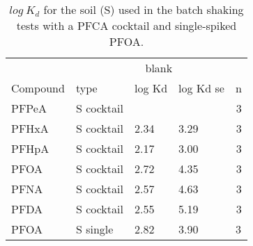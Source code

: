 \begin{table}[ht]
\caption{$log~K_d$ for the soil (S) used in the batch shaking tests with a PFCA cocktail and single-spiked PFOA.}
\centering
\label{apptab:soil_Kd}
\begin{tabular}{llllr} \toprule
         & \multicolumn{4}{c}{blank}                                \\ \cline{2-5} 
Compound & type        & log Kd & log Kd se & \multicolumn{1}{l}{n} \\ \midrule
PFPeA    & S cocktail &        &           & 3                     \\
PFHxA    & S cocktail & 2.34   & 3.29      & 3                     \\
PFHpA    & S cocktail & 2.17   & 3.00      & 3                     \\
PFOA     & S cocktail & 2.72   & 4.35      & 3                     \\
PFNA     & S cocktail & 2.57   & 4.63      & 3                     \\
PFDA     & S cocktail & 2.55   & 5.19      & 3                     \\
PFOA     & S single    & 2.82   & 3.90      & \multicolumn{1}{l}{3} \\ \bottomrule
\end{tabular}
\end{table}